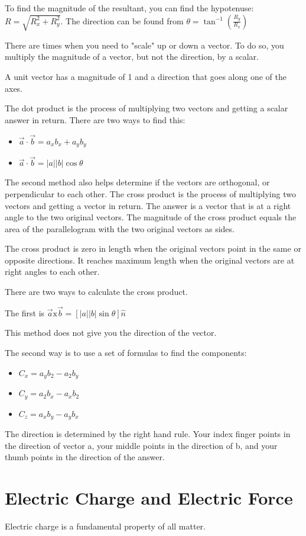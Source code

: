 \documentclass[../em.tex]{subfiles}
\begin{document}
To find the magnitude of the resultant, you can find the hypotenuse: $R = \sqrt{R_x^2+R_y^2}$. The direction can be found from $\theta = \tan^{-1}\left(\frac{R_y}{R_x}\right)$

There are times when you need to "scale" up or down a vector. To do so, you multiply the magnitude of a vector, but not the direction, by a scalar.

A unit vector has a magnitude of 1 and a direction that goes along one of the axes. 

The dot product is the process of multiplying two vectors and getting a scalar answer in return. There are two ways to find this:
\begin{itemize}
    \item $\vec{a}\cdot \vec{b} = a_xb_x+a_yb_y$
    \item $\vec{a}\cdot \vec{b} = |a||b|\cos \theta$
\end{itemize}
The second method also helps determine if the vectors are orthogonal, or perpendicular to each other.\smallbreak
The cross product is the process of multiplying two vectors and getting a vector in return. The answer is a vector that is at a right angle to the two original vectors. The magnitude of the cross product equals the area of the parallelogram with the two original vectors as sides.

The cross product is zero in length when the original vectors point in the same or opposite directions. It reaches maximum length when the original vectors are at right angles to each other.

There are two ways to calculate the cross product.

The first is $\vec{a} \text{x} \vec{b} = [|a||b|\sin \theta]\hat{n}$

This method does not give you the direction of the vector.

The second way is to use a set of formulas to find the components:
\begin{itemize}
    \item $C_x=a_yb_2-a_2b_y$
    \item $C_y=a_2b_x-a_xb_2$
    \item $C_z=a_xb_y-a_yb_x$
\end{itemize}
The direction is determined by the right hand rule. Your index finger points in the direction of vector a, your middle points in the direction of b, and your thumb points in the direction of the answer.
\section{Electric Charge and Electric Force}
Electric charge is a fundamental property of all matter.
\end{document}
